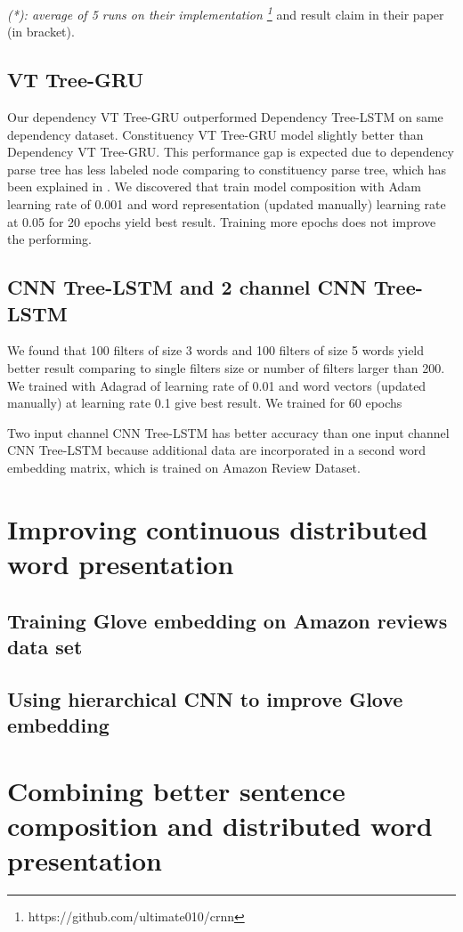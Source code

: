 \textit{(*): average of 5 runs on their implementation \footnote{https://github.com/ultimate010/crnn}} and result claim in their paper (in bracket).


\subsection{VT Tree-GRU}
Our dependency VT Tree-GRU outperformed Dependency Tree-LSTM on same dependency dataset. Constituency VT Tree-GRU model slightly better than Dependency VT Tree-GRU. This performance gap is expected due to dependency parse tree has less labeled node comparing to constituency parse tree, which has been explained in \cite{treeLSTM}. We discovered that train model composition with Adam learning rate of 0.001 and word representation (updated manually) learning rate at 0.05 for 20 epochs yield best result. Training more epochs does not improve the performing.


\subsection{CNN Tree-LSTM and 2 channel CNN Tree-LSTM}
We found that 100 filters of size 3 words and 100 filters of size 5 words yield better result comparing to single filters size or number of filters larger than 200. We trained with Adagrad of learning rate of 0.01 and word vectors (updated manually) at learning rate 0.1 give best result. We trained for 60 epochs

Two input channel CNN Tree-LSTM has better accuracy than one input channel CNN Tree-LSTM because additional data are incorporated in a second word embedding matrix, which is trained on Amazon Review Dataset.






\section{Improving continuous distributed word presentation}

\subsection{Training Glove embedding on Amazon reviews data set}

\subsection{Using hierarchical CNN to improve Glove embedding}


\section{Combining better sentence composition and distributed word presentation}
